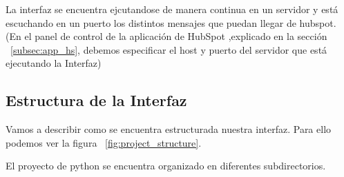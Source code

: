 La interfaz se encuentra ejcutandose de manera continua en un servidor y está escuchando en un puerto los distintos mensajes que puedan llegar de hubspot.
(En el panel de control de la aplicación de HubSpot ,explicado en la sección ~\ref{subsec:app_hs}, debemos especificar el host y puerto del servidor que está ejecutando la Interfaz)


\subsection{Estructura de la Interfaz}
Vamos a describir como se encuentra estructurada nuestra interfaz. Para ello podemos ver la figura ~\ref{fig:project_structure}. 

El proyecto de python se encuentra organizado en diferentes subdirectorios.

